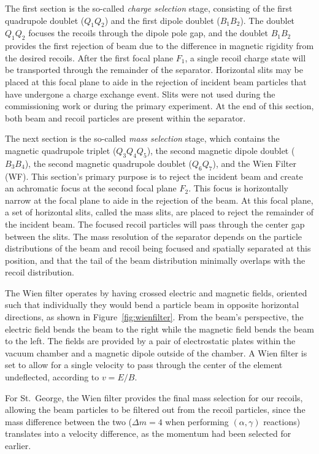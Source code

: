 The first section is the so-called \textit{charge selection} stage,
consisting of the first quadrupole doublet ($Q_1Q_2$) and the first
dipole doublet ($B_1B_2$). The doublet $Q_1Q_2$ focuses the recoils
through the dipole pole gap, and the doublet $B_1B_2$ provides the first
rejection of beam due to the difference in magnetic rigidity from the
desired recoils. After the first focal plane $F_1$, a single recoil
charge state will be transported through the remainder of the separator.
Horizontal slits may be placed at this focal plane to aide in the
rejection of incident beam particles that have undergone a charge
exchange event. Slits were not used during the commissioning work or
during the primary experiment. At the end of this section, both beam and
recoil particles are present within the separator.

The next section is the so-called \textit{mass selection} stage, which
contains the magnetic quadrupole triplet ($Q_3Q_4Q_5$), the second
magnetic dipole doublet ($B_3B_4$), the second magnetic quadrupole
doublet ($Q_6Q_7$), and the Wien Filter (WF). This section's primary
purpose is to reject the incident beam and create an achromatic focus at
the second focal plane $F_2$. This focus is horizontally narrow at the
focal plane to aide in the rejection of the beam. At this focal plane, a
set of horizontal slits, called the mass slits, are placed to reject the
remainder of the incident beam. The focused recoil particles will pass
through the center gap between the slits. The mass resolution of the
separator depends on the particle distributions of the beam and recoil
being focused and spatially separated at this position, and that the
tail of the beam distribution minimally overlaps with the recoil
distribution.

The Wien filter operates by having crossed electric and magnetic fields,
oriented such that individually they would bend a particle beam in
opposite horizontal directions, as shown in Figure~\ref{fig:wienfilter}.
From the beam's perspective, the electric field bends the beam to the
right while the magnetic field bends the beam to the left. The fields
are provided by a pair of electrostatic plates within the vacuum chamber
and a magnetic dipole outside of the chamber. A Wien filter is set to
allow for a single velocity to pass through the center of the element
undeflected, according to $v = E/B$.

For St.\ George, the Wien filter
provides the final mass selection for our recoils, allowing the beam
particles to be filtered out from the recoil particles, since the mass
difference between the two ($\Delta m = 4$ when performing
$(\alpha,\gamma)$ reactions) translates into a velocity difference, as
the momentum had been selected for earlier.

